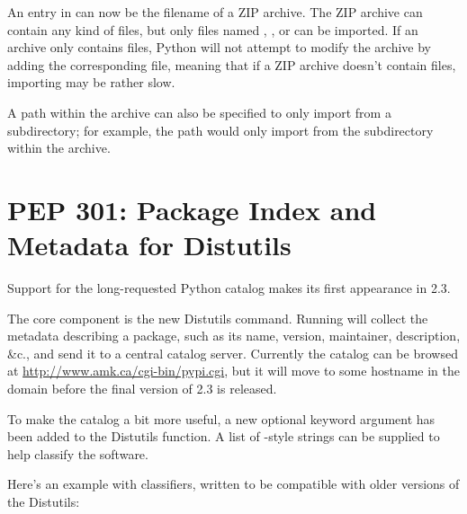 \documentclass{howto}
\begin{document}
An entry in  can now be the filename of a ZIP archive.
The ZIP archive can contain any kind of files, but only files named
, , or  can be imported.  If an
archive only contains  files, Python will not attempt to
modify the archive by adding the corresponding  file, meaning
that if a ZIP archive doesn't contain  files, importing may be
rather slow.

A path within the archive can also be specified to only import from a
subdirectory; for example, the path 
would only import from the  subdirectory within the
archive.

\begin{seealso}


\end{seealso}

\section{PEP 301: Package Index and Metadata for
Distutils\label{section-pep301}}

Support for the long-requested Python catalog makes its first
appearance in 2.3.

The core component is the new Distutils  command.
Running  will collect the metadata
describing a package, such as its name, version, maintainer,
description, \&c., and send it to a central catalog server.
Currently the catalog can be browsed at
\url{http://www.amk.ca/cgi-bin/pypi.cgi}, but it will move to 
some hostname in the  domain before the final version
of 2.3 is released.

To make the catalog a bit more useful, a new optional
 keyword argument has been added to the Distutils
 function.  A list of
-style
strings can be supplied to help classify the software.

Here's an example  with classifiers, written to be compatible 
with older versions of the Distutils:
\end{document}
